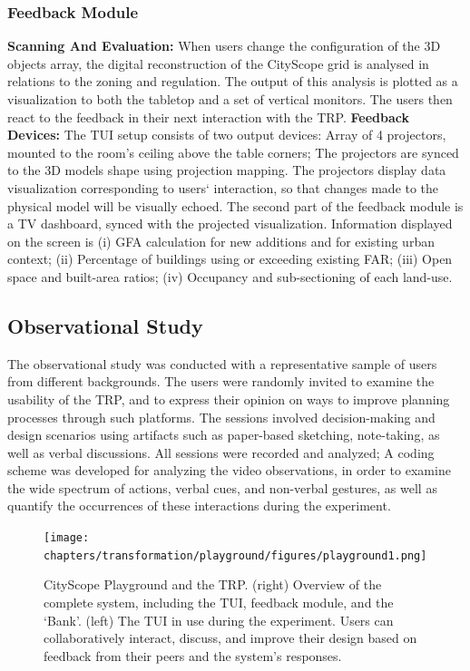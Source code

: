 {    \subsubsection{Feedback Module}

    {
        \textbf{Scanning And Evaluation:} When users change the configuration of the 3D objects array, the digital reconstruction of the CityScope grid is analysed in relations to the zoning and regulation. The output of this analysis is plotted as a visualization to both the tabletop and a set of vertical monitors. The users then react to the feedback in their next interaction with the TRP.
        \newline
        \textbf{Feedback Devices:} The TUI setup consists of two output devices: Array of 4 projectors, mounted to the room's ceiling above the table corners; The projectors are synced to the 3D models shape using projection mapping. The projectors display data visualization corresponding to users` interaction, so that changes made to the physical model will be visually echoed.
        The second part of the feedback module is a TV dashboard, synced with the projected visualization. Information displayed on the screen is (i) GFA calculation for new additions and for existing urban context; (ii) Percentage of buildings using or exceeding existing FAR; (iii) Open space and built-area ratios; (iv) Occupancy and sub-sectioning of each land-use.

    }

    \subsection{Observational Study}

    {
        The observational study was conducted with a representative sample of users from different backgrounds. The users were randomly invited to examine the usability of the TRP, and to express their opinion on ways to improve planning processes through such platforms. The sessions involved decision-making and design scenarios using artifacts such as paper-based sketching, note-taking, as well as verbal discussions. All sessions were recorded and analyzed; A coding scheme was developed for analyzing the video observations, in order to examine the wide spectrum of actions, verbal cues, and non-verbal gestures, as well as quantify the occurrences of these interactions during the experiment.


        \begin{figure}[!htb]
            \begin{center}
                \texttt{[image: chapters/transformation/playground/figures/playground1.png]}
            \end{center}
            \caption{CityScope Playground and the TRP. (right) Overview of the complete system, including the TUI, feedback module, and the `Bank'. (left) The TUI in use during the experiment. Users can collaboratively interact, discuss, and improve their design based on feedback from their peers and the system's responses.}
            \label{fig:pg_trp}
        \end{figure}

}}
